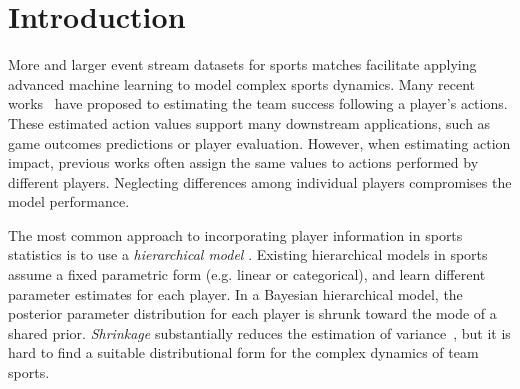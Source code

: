 \documentclass{article}
\begin{document}
\section{Introduction}
More and larger event stream datasets for sports matches 
facilitate applying advanced 
machine learning to model complex sports dynamics.
Many recent works~\cite{Liu2018,decroos2018action,fernandez2019decomposing} have proposed to estimating the team success following a player's actions. These estimated action values support many downstream applications, such as game outcomes predictions or player evaluation. However, when estimating action impact, previous works often 
assign the same values to actions performed by different players. Neglecting differences among individual players compromises the model performance. 

The most common approach to incorporating player information in sports statistics is to use a {\em hierarchical model} \cite{kruschke2014doing,Gelman06}. Existing hierarchical models in sports assume a fixed parametric form (e.g. linear or categorical), and learn different parameter estimates for each player. In a Bayesian hierarchical model, the posterior parameter distribution for each player is shrunk toward the mode of a shared prior. {\em Shrinkage} substantially reduces the estimation of variance~\cite{Murphybook12}, but it is hard to find a suitable distributional form for the complex dynamics of team sports.
\end{document}
